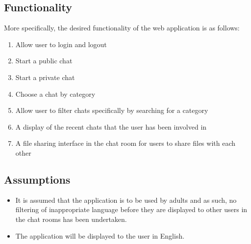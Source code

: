 \documentclass{sig-alt-release2}
\begin{document}
\subsection{Functionality}
\label{sec: functionality}
More specifically, the desired functionality of the web application is as follows:
\begin{enumerate}
\item Allow user to login and logout
\item Start a public chat
\item Start a private chat
\item Choose a chat by category
\item Allow user to filter chats specifically by searching for a category
\item A display of the recent chats that the user has been involved in
\item A file sharing interface in the chat room for users to share files with each other
\end{enumerate}
\subsection{Assumptions}
\label{sec: assumptions} 
\begin{itemize} 
\item It is assumed that the application is to be used by adults and as such, no filtering of inappropriate language before they are displayed to other users in the chat rooms has been undertaken.
\item The application will be displayed to the user in English.
\end{itemize}

\end{document}
